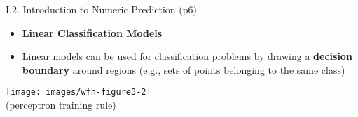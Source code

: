 \documentclass[handout]{beamer}
\newcommand{\stronger}[1]{\textbf{\color{purple} #1}}
\begin{document}
\begin{frame}{I.2. Introduction to Numeric Prediction (p6)}
\begin{itemize}
\item[] \stronger{Linear Classification Models}
\item Linear models can be used for classification problems by drawing a \stronger{decision boundary} around regions (e.g., sets of points belonging to the same class) 
\end{itemize}
\begin{center}
\texttt{[image: images/wfh-figure3-2]}\\
(perceptron training rule)\\
\cite[Figure 3.2]{WFH3:2011}
\end{center}
\end{frame}



\end{document}
